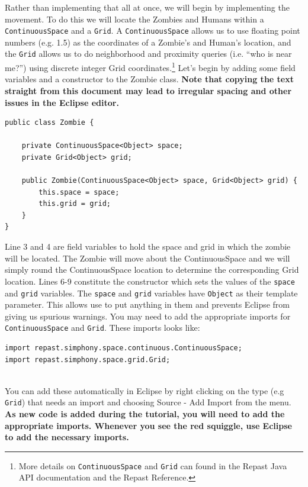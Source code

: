 \documentclass[11pt]{amsart}
\begin{document}
Rather than implementing that all at once, we will begin by implementing the movement. To do this we will locate the Zombies and Humans within a \texttt{ContinuousSpace} and a \texttt{Grid}. A \texttt{ContinuousSpace} allows us to use floating point numbers (e.g. 1.5) as the coordinates of a Zombie's and Human's location, and the \texttt{Grid} allows us to do neighborhood and proximity queries (i.e. ``who is near me?'') using discrete integer Grid coordinates.\footnote{More details on \texttt{ContinuousSpace} and \texttt{Grid} can found in the Repast Java API documentation and the Repast Reference.} Let's begin by adding some field variables and a constructor to the Zombie class. \textbf{Note that copying the text straight from this document may lead to irregular spacing and other issues in the Eclipse editor.}

\noindent\begin{minipage}[h]{\textwidth}
\vspace{.2in}
\lstset{language=java,caption=Zombie Constructor and Variables}
\begin{lstlisting}
public class Zombie {

	private ContinuousSpace<Object> space;
	private Grid<Object> grid;
	
	public Zombie(ContinuousSpace<Object> space, Grid<Object> grid) {
		this.space = space;
		this.grid = grid;
	}
}
\end{lstlisting}
\vspace{.2in}
\end{minipage}

Line 3 and 4 are field variables to hold the space and grid in which the zombie will be located. The Zombie will move about the ContinuousSpace and we will simply round the ContinuousSpace location to determine the corresponding Grid location. Lines 6-9 constitute the constructor which sets the values of the \texttt{space} and \texttt{grid} variables. The \texttt{space} and \texttt{grid} variables have \texttt{Object} as their template parameter. This allows use to put anything in them and prevents Eclipse from giving us spurious warnings. You may need to add the appropriate imports for \texttt{ContinuousSpace} and \texttt{Grid}. These imports looks like:

\noindent\begin{minipage}[h]{\textwidth}
\vspace{.2in}
\lstset{language=java,caption=Zombie Imports}
\begin{lstlisting}
import repast.simphony.space.continuous.ContinuousSpace;
import repast.simphony.space.grid.Grid;
  
\end{lstlisting}
\vspace{.2in}
\end{minipage}
You can add these automatically in Eclipse by right clicking on the type (e.g  \texttt{Grid}) that needs an import and choosing Source - Add Import from the menu. \textbf{As new code is added during the tutorial, you will need to add the appropriate imports. Whenever you see the red squiggle, use Eclipse to add the necessary imports.}\\
\end{document}
